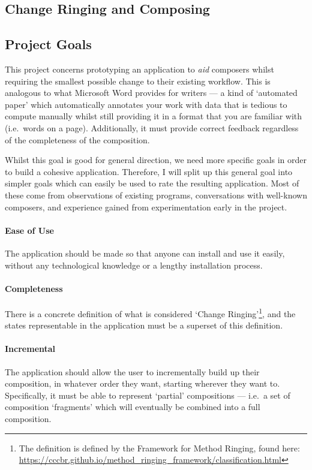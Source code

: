 \documentclass[12pt]{article}
\begin{document}
\subsection{Change Ringing and Composing}

\subsection{Project Goals}

This project concerns prototyping an application to \emph{aid} composers whilst requiring the
smallest possible change to their existing workflow.  This is analogous to what Microsoft Word
provides for writers --- a kind of `automated paper' which automatically annotates your work with
data that is tedious to compute manually whilst still providing it in a format that you are familiar
with (i.e.\ words on a page).  Additionally, it must provide correct feedback regardless of the
completeness of the composition.

Whilst this goal is good for general direction, we need more specific goals in order to build a
cohesive application.  Therefore, I will split up this general goal into simpler goals which can
easily be used to rate the resulting application.  Most of these come from observations of existing
programs, conversations with well-known composers, and experience gained from experimentation early
in the project.

\paragraph{Ease of Use} The application should be made so that anyone can install and use it easily,
without any technological knowledge or a lengthy installation process.

\paragraph{Completeness} There is a concrete definition of what is considered `Change
Ringing'\footnote{The definition is defined by the Framework for Method Ringing, found here:
\url{https://cccbr.github.io/method_ringing_framework/classification.html}}, and the states
representable in the application must be a superset of this definition.

\paragraph{Incremental} The application should allow the user to incrementally build up their
composition, in whatever order they want, starting wherever they want to.  Specifically, it must
be able to represent `partial' compositions --- i.e.\ a set of composition `fragments' which will
eventually be combined into a full composition.
\end{document}
